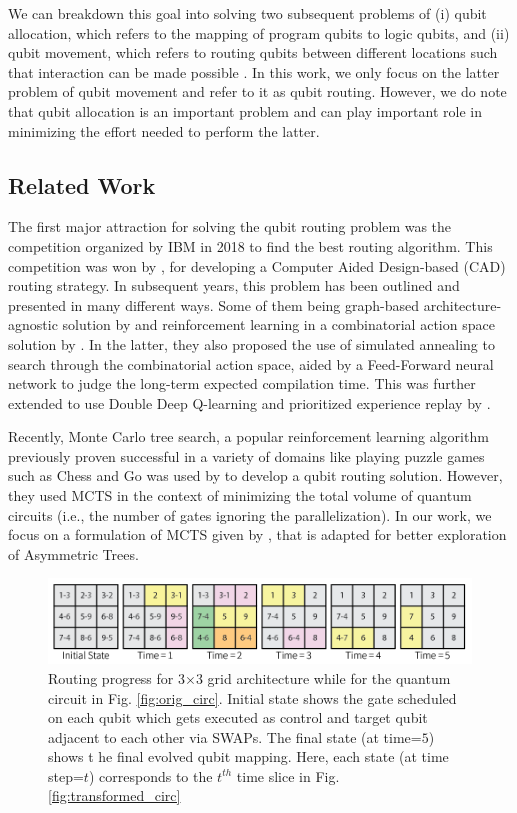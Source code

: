 \documentclass[%
 reprint,
 amsmath,amssymb,
 aps,
]{revtex4-2}
\begin{document}
We can breakdown this goal into solving two subsequent problems of (i) qubit allocation, which refers to the mapping of program qubits to logic qubits, and (ii) qubit movement, which refers to routing qubits between different locations such that interaction can be made possible \citep{}. In this work, we only focus on the latter problem of qubit movement and refer to it as qubit routing. However, we do note that qubit allocation is an important problem and can play important role in minimizing the effort needed to perform the latter.

\subsection{\label{sec:intro-related}Related Work}

The first major attraction for solving the qubit routing problem was the competition organized by IBM in 2018 to find the best routing algorithm. This competition was won by \citet{zulehner2018mapping}, for developing a Computer Aided Design-based (CAD) routing strategy. In subsequent years, this problem has been outlined and presented in many different ways. Some of them being graph-based architecture-agnostic solution by \citet{qroute_tket} and reinforcement learning in a combinatorial action space solution by \citet{qroute_dqn1}. In the latter, they also proposed the use of simulated annealing to search through the combinatorial action space, aided by a Feed-Forward neural network to judge the long-term expected compilation time. This was further extended to use Double Deep Q-learning and prioritized experience replay by \citet{qroute_dqn2}. 

Recently, Monte Carlo tree search, a popular reinforcement learning algorithm \citep{mcts_bandits_0, mcts_bandits_1, mcts_uct} previously proven successful in a variety of domains like playing puzzle games such as Chess and Go \citep{mcts_alphago} was used by \citet{qroute_mcts} to develop a qubit routing solution. However, they used MCTS in the context of minimizing the total volume of quantum circuits (i.e., the number of gates ignoring the parallelization). In our work, we focus on a formulation of MCTS given by \citet{mcts_assymetric}, that is adapted for better exploration of Asymmetric Trees. 

\begin{figure}[t]
    \includegraphics[width=\linewidth]{images/mcts_progress.png}
    \caption{\label{fig:routing-progress}Routing progress for 3$\times$3 grid architecture while for the quantum circuit in Fig. \ref{fig:orig_circ}. Initial state shows the gate scheduled on each qubit which gets executed as control and target qubit adjacent to each other via SWAPs. The final state (at time=$5$) shows t he final evolved qubit mapping. Here, each state (at time step=$t$) corresponds to the $t^{th}$ time slice in Fig. \ref{fig:transformed_circ}}
\end{figure}
\end{document}
